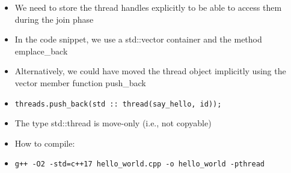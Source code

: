 \begin{itemize}
	\item We need to store the thread handles explicitly to be able
to access them during the join phase
	\item In the code snippet, we use a std::vector container and
the method emplace_back
	\item Alternatively, we could have moved the thread object
implicitly using the vector member function push_back
	\item \lstinline|threads.push_back(std :: thread(say_hello, id));|
	\item The type std::thread is move-only (i.e., not copyable)
	\item How to compile:
	\item \lstinline|g++ -O2 -std=c++17 hello_world.cpp -o hello_world -pthread|
\end{itemize}

